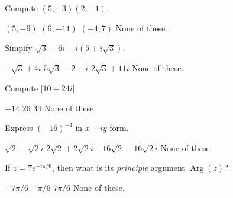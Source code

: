 \documentclass[12pt]{exam}
\begin{document}
\begin{questions}

\setcounter{question}{0}

\question Compute \((5,-3)(2,-1)\). 
\begin{choices}
\choice \((5,-9)\) 
\choice \((6,-11)\) 
\choice \((-4,7)\) 
\choice None of these. 
\end{choices}


\question Simpify \(\overline{\sqrt3 - 6i - i(5+i\sqrt3)}\). 
\begin{choices}
\choice \(-\sqrt3 +4i\)
\choice \(5\sqrt3 -2+i\)
\choice \(2\sqrt3 +11i \)
\choice None of these. 
\end{choices}

\question Compute \(|10-24i|\)
\begin{choices}
\choice \(-14\)
\choice \(26\)
\choice \(34\)
\choice None of these. 
\end{choices}


\question Express \((-16)^{-4}\) in \(x+iy\) form.
\begin{choices}
\choice \(\sqrt 2-\sqrt 2 i\)
\choice \(2\sqrt 2+2\sqrt 2 i\)
\choice \(-16\sqrt 2-16\sqrt 2 i\)
\choice None of these. 
\end{choices}

\question If \(z=7e^{-i\pi/6}\), then what is its \textit{principle} argument
\(\operatorname{Arg}(z)\)?
\begin{choices}
\choice \(-7\pi/6\) 
\choice \(-\pi/6\) 
\choice \(7\pi/6\) 
\choice None of these. 
\end{choices}
\end{questions}
\end{document}
